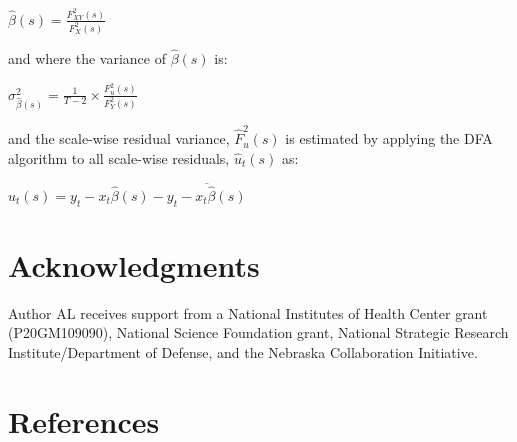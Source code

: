 \documentclass[
  man]{apa6}
\begin{document}
\(\widehat{\beta}(s) = \frac{F^2_{XY}(s)}{F^2_X(s)}\)

and where the variance of \(\widehat{\beta}(s)\) is:

\(\sigma_{\widehat{\beta}(s)}^2 = \frac{1}{T-2} \times \frac{F^2_u(s)}{F^2_Y(s)}\)

and the scale-wise residual variance, \(\widehat{F}^2_u(s)\) is estimated
by applying the DFA algorithm to all scale-wise residuals,
\(\widehat{u}_t(s)\) as:

\(\widehat{u}_t(s) = y_t - x_t\widehat{\beta}(s) - \overline{y_t - x_t\widehat{\beta}(s)}\)

\hypertarget{acknowledgments}{%
\section{Acknowledgments}\label{acknowledgments}}

Author AL receives support from a National Institutes of Health Center
grant (P20GM109090), National Science Foundation grant, National
Strategic Research Institute/Department of Defense, and the Nebraska
Collaboration Initiative.

\newpage

\hypertarget{references}{%
\section{References}\label{references}}

\begingroup
\setlength{\parindent}{-0.5in}
\setlength{\leftskip}{0.5in}
\end{document}
